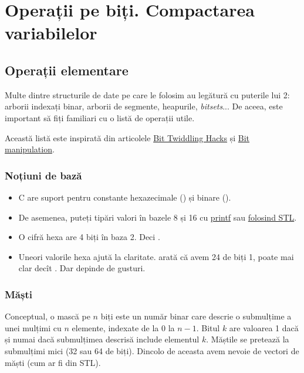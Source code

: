 \chapter{Operații pe biți. Compactarea variabilelor}

\section{Operații elementare}

Multe dintre structurile de date pe care le folosim au legătură cu puterile lui 2: arborii indexați binar, arborii de segmente, heapurile, \textit{bitsets}... De aceea, este important să fiți familiari cu o listă de operații utile.

Această listă este inspirată din articolele \href{https://graphics.stanford.edu/~seander/bithacks.html}{Bit Twiddling Hacks} și \href{https://cp-algorithms.com/algebra/bit-manipulation.html}{Bit manipulation}.

\subsection{Noțiuni de bază}

\begin{itemize}
  \item C are suport pentru constante hexazecimale () și binare ().

  \item De asemenea, puteți tipări valori în bazele 8 și 16 cu \href{https://linux.die.net/man/3/printf}{printf} sau \href{https://en.cppreference.com/w/cpp/io/manip/hex}{folosind STL}.

  \item O cifră hexa are 4 biți în baza 2. Deci .

  \item Uneori valorile hexa ajută la claritate.  arată că avem 24 de biți 1, poate mai clar decît . Dar depinde de gusturi.
\end{itemize}

\subsection{Măști}

Conceptual, o mască pe $n$ biți este un număr binar care descrie o submulțime a unei mulțimi cu $n$ elemente, indexate de la $0$ la $n-1$. Bitul $k$ are valoarea 1 dacă și numai dacă submulțimea descrisă include elementul $k$. Măștile se pretează la submulțimi mici (32 sau 64 de biți). Dincolo de aceasta avem nevoie de vectori de măști (cum ar fi  din STL).

